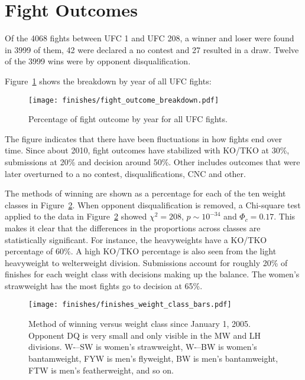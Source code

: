 \clearpage
\section*{Fight Outcomes}

Of the 4068 fights between UFC 1 and UFC 208,
a winner and loser were found in 3999 of them,
42 were declared a no contest and 27 resulted in a draw.
Twelve of the 3999 wins were by opponent disqualification.

Figure~\ref{fight_outcome_by_year} shows the breakdown
by year of all UFC fights:

\begin{figure}[h]
\begin{center}
\texttt{[image: finishes/fight\_outcome\_breakdown.pdf]}
\caption{Percentage of fight outcome by year for all UFC fights.}
\label{fight_outcome_by_year}
\end{center}
\end{figure}

The figure indicates that there have been fluctuations in how
fights end over time. Since about 2010, fight outcomes have
stabilized with KO/TKO at 30\%, submissions at 20\% and decision
around 50\%.
Other includes outcomes that were later overturned to a no contest,
disqualifications, CNC and other.

The methods of winning are shown as a percentage for each
of the ten weight classes in Figure~\ref{finishes_weight_class_bars}.
When opponent disqualification is removed, a Chi-square test
applied to the data in Figure~\ref{finishes_weight_class_bars}
showed $\chi^2=208$, $p \sim 10^{-34}$ and $\Phi_c=0.17$. This makes it
clear that the differences in the proportions across classes are
statistically significant.
For instance, the heavyweights have a KO/TKO percentage of 60\%.
A high KO/TKO percentage is also seen from the light heavyweight
to welterweight division.
Submissions account for roughly 20\% of finishes for each weight class with
decisions making up the balance. The women's strawweight has the
most fights go to decision at 65\%.

\begin{figure}[h]
\begin{center}
\texttt{[image: finishes/finishes\_weight\_class\_bars.pdf]}
\caption{Method of winning versus weight class since January 1, 2005.
Opponent DQ is very small and only visible in the MW and LH divisions.
W-–SW is women's strawweight, W-–BW is women's bantamweight, FYW is
men's flyweight, BW is men's bantamweight, FTW is men's
featherweight, and so on.}
\label{finishes_weight_class_bars}
\end{center}
\end{figure}

